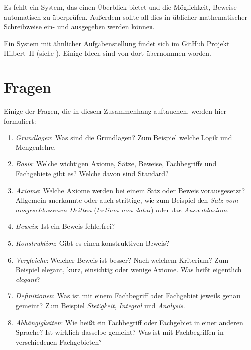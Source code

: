 \documentclass[english,ngerman,parskip=half,headsepline,footsepline]{scrreprt}
\begin{document}
	Es fehlt ein System, das einen Überblick bietet und die Möglichkeit, Beweise automatisch zu überprüfen. Außerdem sollte all dies in üblicher mathematischer Schreibweise ein- und ausgegeben werden können.
	
	Ein System mit ähnlicher Aufgabenstellung findet sich im GitHub Projekt Hilbert~II (siehe \cite{bib:HilbertII,bib:qedeq}). Einige Ideen sind von dort übernommen worden.
	
	\section{Fragen}
	\label{sec:Fragen}
	Einige der Fragen, die in diesem Zusammenhang auftauchen, werden hier formuliert:
	
	\begin{enumerate}
		
		\item \label{Frage:Grundlagen} \emph{Grundlagen}: Was sind die Grundlagen? Zum Beispiel welche Logik und Mengenlehre.
		
		\item \label{Frage:Basis} \emph{Basis}: Welche wichtigen Axiome, Sätze, Beweise, Fachbegriffe und Fachgebiete gibt es? Welche davon sind Standard?
		
		\item \label{Frage:Axiome} \emph{Axiome}: Welche Axiome werden bei einem Satz oder Beweis vorausgesetzt? Allgemein anerkannte oder auch strittige, wie zum Beispiel den \emph{Satz vom ausgeschlossenen Dritten} (\emph{tertium non datur}) oder das \emph{Auswahlaxiom}.
		
		\item \label{Frage:Beweis} \emph{Beweis}: Ist ein Beweis fehlerfrei?
		
		\item \label{Frage:Konstruktion} \emph{Konstruktion}: Gibt es einen konstruktiven Beweis?
		
		\item \label{Frage:Vergleiche} \emph{Vergleiche}: Welcher Beweis ist besser? Nach welchem Kriterium? Zum Beispiel elegant, kurz, einsichtig oder wenige Axiome. Was heißt eigentlich \emph{elegant}?
		
		\item \label{Frage:Definitionen} \emph{Definitionen}: Was ist mit einem Fachbegriff oder Fachgebiet jeweils genau gemeint? Zum Beispiel \emph{Stetigkeit}, \emph{Integral} und \emph{Analysis}.
		
		\item \label{Frage:Abhängigkeiten} \emph{Abhängigkeiten}: Wie heißt ein Fachbegriff oder Fachgebiet in einer anderen Sprache? Ist wirklich dasselbe gemeint? Was ist mit Fachbegriffen in verschiedenen Fachgebieten?
		

\end{enumerate}
\end{document}
